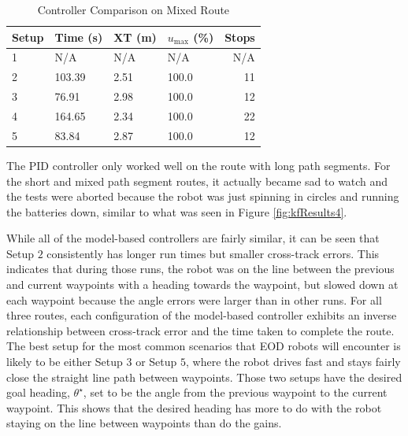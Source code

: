 \begin{table}[ht!]
\caption{Controller Comparison on Mixed Route}
\small
\centering
\begin{tabular}{@{}llllr@{}} \toprule
Setup & Time (s) & XT (m) & $u_{\text{max}}$ (\%) & Stops \\ \midrule
1     & N/A      & N/A    & N/A                   & N/A   \\
2     & 103.39   & 2.51   & 100.0                 & 11    \\
3     & 76.91    & 2.98   & 100.0                 & 12    \\
4     & 164.65   & 2.34   & 100.0                 & 22    \\
5     & 83.84    & 2.87   & 100.0                 & 12    \\ \bottomrule
\end{tabular}
\label{tab:resultsControllersMixed}
\end{table}

The PID controller only worked well on the route with long path segments. For the short and mixed path segment routes, it actually became sad to watch and the tests were aborted because the robot was just spinning in circles and running the batteries down, similar to what was seen in Figure \ref{fig:kfResults4}.

While all of the model-based controllers are fairly similar, it can be seen that Setup $2$ consistently has longer run times but smaller cross-track errors. This indicates that during those runs, the robot was on the line between the previous and current waypoints with a heading towards the waypoint, but slowed down at each waypoint because the angle errors were larger than in other runs. For all three routes, each configuration of the model-based controller exhibits an inverse relationship between cross-track error and the time taken to complete the route. The best setup for the most common scenarios that EOD robots will encounter is likely to be either Setup $3$ or Setup $5$, where the robot drives fast and stays fairly close the straight line path between waypoints. Those two setups have the desired goal heading, $\theta^\star$, set to be the angle from the previous waypoint to the current waypoint. This shows that the desired heading has more to do with the robot staying on the line between waypoints than do the gains.
